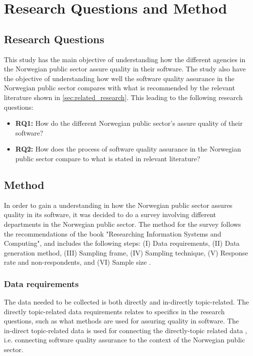 \chapter{Research Questions and Method}

\section{Research Questions} 
This study has the main objective of understanding how the different agencies in the Norwegian public sector assure quality in their software. The study also have the objective of understanding how well the software quality assurance in the Norwegian public sector compares with what is recommended by the relevant literature shown in \autoref{sec:related_research}. This leading to the following research questions:

\begin{itemize}
    \item \textbf{RQ1:} How do the different Norwegian public sector's assure quality of their software?
    \item \textbf{RQ2:} How does the process of software quality assurance in the Norwegian public sector compare to what is stated in relevant literature?
\end{itemize}

\section{Method}
In order to gain a understanding in how the Norwegian public sector assures quality in its software, it was decided to do a survey involving different departments in the Norwegian public sector. The method for the survey follows the recommendations of the book "Researching Information Systems and Computing", and includes the following steps: (I) Data requirements, (II) Data generation method, (III) Sampling frame, (IV) Sampling technique, (V) Response rate and non-respondents, and (VI) Sample size \cite{bjo_2022}.

\subsection{Data requirements}
The data needed to be collected is both directly and in-directly topic-related. The directly topic-related data requirements relates to specifics in the research questions, such as what methods are used for assuring quality in software. The in-direct topic-related data is used for connecting the directly-topic related data \cite{bjo_2022}, i.e. connecting software quality assurance to the context of the Norwegian public sector.

